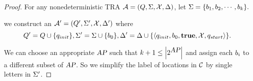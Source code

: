 \begin{proof}
For any nonedeterministic TRA $\mathcal{A} = (Q,\Sigma,\mathcal{X},\Delta)$, let $\Sigma = \{b_{1}, b_{2}, \cdots, b_{k}\}.$

we construct an $\mathcal{A}' = (Q', \Sigma', \mathcal{X}, \Delta')$ where
$$
    Q'   = Q  \cup \{ q_{init } \},
    \Sigma'  = \Sigma \cup \{ b_{0} \},
    \Delta'     = \Delta    \cup \{ \langle
            q_{init },
            b_{0},
            \mathbf{true},
            \mathcal{X},
            q_{start}
        \rangle
    \}.
$$

We can choose an appropriate $\mbox{\sl AP}$ such that $ k + 1 \le \left| 2^{\mbox{\sl AP}} \right| $
and assign each $b_{i}$ to a different subset of $\mbox{\sl AP}$. So we simplify the label
of locations in $\mathcal{C}$ by single letters in $\Sigma'$.


\end{proof}
